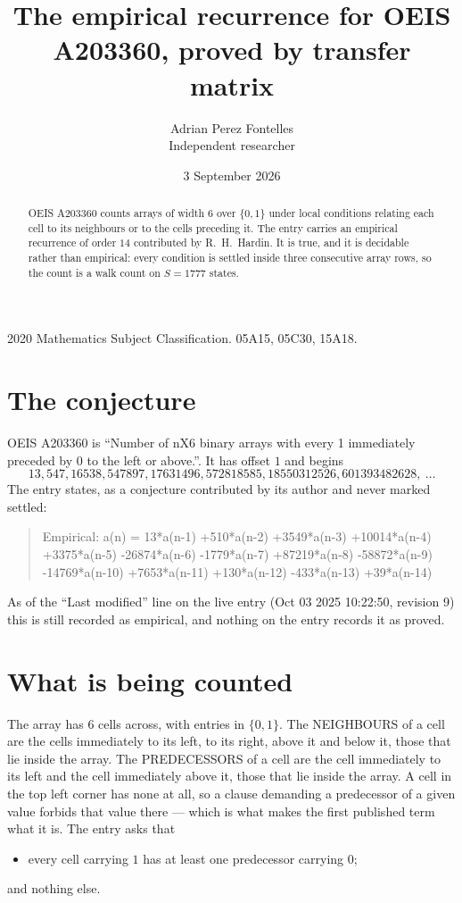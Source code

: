 \documentclass[11pt,a4paper]{article}
\title{The empirical recurrence for OEIS A203360, proved by transfer matrix}
\author{Adrian Perez Fontelles\\ \small Independent researcher}
\date{3 September 2026}
\theoremstyle{plain}
\theoremstyle{definition}
\begin{document}
\maketitle

\begin{abstract}
OEIS A203360 counts arrays of width $6$ over $\{0,1\}$ under local conditions relating each cell
to its neighbours or to the cells preceding it. The entry carries an empirical recurrence of
order $14$ contributed by R.~H.~Hardin. It is true, and it is decidable rather than
empirical: every condition is settled inside three consecutive array rows, so the count is a
walk count on $S=1777$ states.
\end{abstract}

\noindent\small 2020 Mathematics Subject Classification. 05A15, 05C30, 15A18.\normalsize

\section{The conjecture}

OEIS A203360 is ``Number of nX6 binary arrays with every 1 immediately preceded by 0 to the left or above.''. It has offset $1$ and begins
\[
13, 547, 16538, 547897, 17631496, 572818585, 18550312526, 601393482628,\ \dots
\]
The entry states, as a conjecture contributed by its author and never marked settled:
\begin{quote}
Empirical: a(n) = 13*a(n-1) +510*a(n-2) +3549*a(n-3) +10014*a(n-4) +3375*a(n-5) -26874*a(n-6) -1779*a(n-7) +87219*a(n-8) -58872*a(n-9) -14769*a(n-10) +7653*a(n-11) +130*a(n-12) -433*a(n-13) +39*a(n-14)
\end{quote}
As of the ``Last modified'' line on the live entry (Oct 03 2025 10:22:50, revision 9) this is still
recorded as empirical, and nothing on the entry records it as proved.

\section{What is being counted}

The array has $6$ cells across, with entries in $\{0,1\}$. The NEIGHBOURS of a cell are the
cells immediately to its left, to its right, above it and below it, those that lie inside the
array. The PREDECESSORS of a cell are the cell immediately to its left and the cell
immediately above it, those that lie inside the array. A cell in the top left corner has none
at all, so a clause demanding a predecessor of a given value forbids that value there --- which
is what makes the first published term what it is. The entry asks that
\begin{itemize}
\item every cell carrying $1$ has at least one predecessor carrying $0$;
\end{itemize}
and nothing else.
\end{document}
